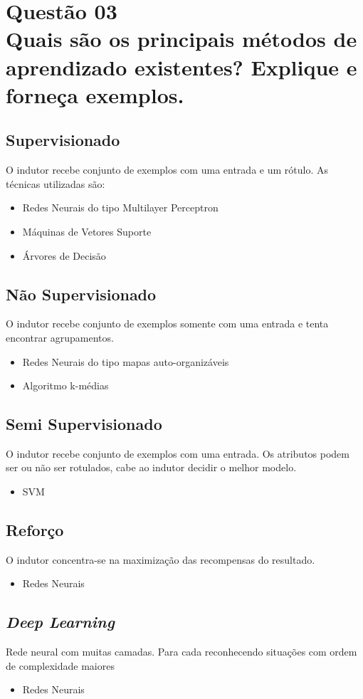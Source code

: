 \documentclass[12pt]{article}
\begin{document}
\section{Questão 03\\
Quais são os principais métodos de aprendizado existentes? Explique e forneça
exemplos.
}
\subsection{Supervisionado}
O indutor recebe conjunto de exemplos com uma entrada e um rótulo.
As técnicas utilizadas são:
\begin{itemize}
    \item Redes Neurais do tipo Multilayer Perceptron
    \item Máquinas de Vetores Suporte
    \item Árvores de Decisão
\end{itemize}

\subsection{Não Supervisionado}
O indutor recebe conjunto de exemplos somente com uma entrada e tenta encontrar agrupamentos.
\begin{itemize}
    \item Redes Neurais do tipo mapas auto-organizáveis
    \item Algoritmo k-médias
\end{itemize}

\subsection{Semi Supervisionado}
O indutor recebe conjunto de exemplos com uma entrada.
Os atributos podem ser ou não ser rotulados, cabe ao indutor decidir o melhor modelo.
\begin{itemize}
    \item SVM
\end{itemize}


\subsection{Reforço}
O indutor concentra-se na maximização das recompensas do resultado.
\begin{itemize}
    \item Redes Neurais
\end{itemize}

\subsection{\textit{Deep Learning}}
Rede neural com muitas camadas. Para cada reconhecendo
situações com ordem de complexidade maiores
\begin{itemize}
    \item Redes Neurais
\end{itemize}
\end{document}
